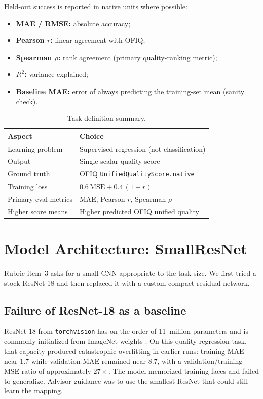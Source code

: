 \documentclass[12pt, letterpaper, titlepage]{article}
\newcommand{\TableHere}[1][0.34\textheight]{%
  \Needspace{#1}%
  \begin{table}[H]%
}
\begin{document}
Held-out success is reported in native units where possible:
\begin{itemize}[leftmargin=*]
    \item \textbf{MAE / RMSE:} absolute accuracy;
    \item \textbf{Pearson $r$:} linear agreement with OFIQ;
    \item \textbf{Spearman $\rho$:} rank agreement (primary quality-ranking metric);
    \item \textbf{$R^2$:} variance explained;
    \item \textbf{Baseline MAE:} error of always predicting the training-set mean (sanity check).
\end{itemize}

\TableHere[8\baselineskip]
\caption{Task definition summary.}
\label{tab:task}
\centering
\footnotesize
\begin{tabularx}{\textwidth}{|L{0.28\textwidth}|Y|}
\hline
\textbf{Aspect} & \textbf{Choice} \\
\hline
Learning problem & Supervised regression (not classification) \\
\hline
Output & Single scalar quality score \\
\hline
Ground truth & OFIQ \texttt{UnifiedQualityScore.native} \\
\hline
Training loss & $0.6\,\mathrm{MSE} + 0.4\,(1-r)$ \\
\hline
Primary eval metrics & MAE, Pearson $r$, Spearman $\rho$ \\
\hline
Higher score means & Higher predicted OFIQ unified quality \\
\hline
\end{tabularx}
\end{table}


\FloatBarrier
\section{Model Architecture: SmallResNet}
\label{sec:arch}

Rubric item~3 asks for a small CNN appropriate to the task size. We first tried a stock ResNet-18 and then replaced it with a custom compact residual network.

\subsection{Failure of ResNet-18 as a baseline}

ResNet-18 from \texttt{torchvision} has on the order of 11~million parameters and is commonly initialized from ImageNet weights \citep{he2016resnet,deng2009imagenet,paszke2019pytorch}. On this quality-regression task, that capacity produced catastrophic overfitting in earlier runs: training MAE near $1.7$ while validation MAE remained near $8.7$, with a validation/training MSE ratio of approximately $27\times$. The model memorized training faces and failed to generalize. Advisor guidance was to use the smallest ResNet that could still learn the mapping.
\end{document}
